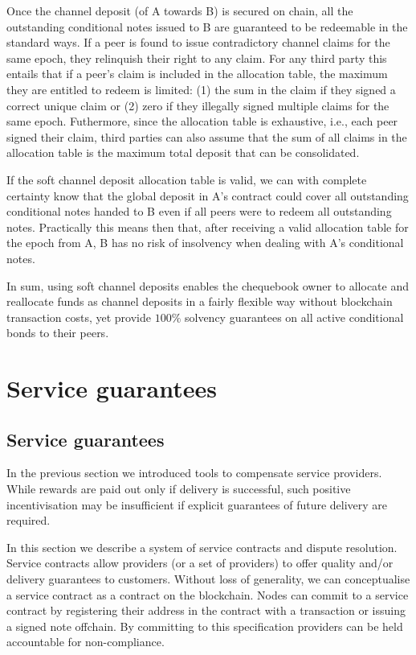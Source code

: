 \documentclass[a4paper,10pt]{article}
\begin{document}
Once the channel deposit (of A towards B) is secured on chain, all the outstanding conditional notes
issued to B are guaranteed to be redeemable in the standard ways.
If a peer is found to issue contradictory channel claims for the same epoch, they relinquish
their right to any claim. For any third party this entails that if a peer's claim is
included in the allocation table, the maximum they are entitled to redeem is limited:
(1) the sum in the claim if they signed a correct unique claim or
(2) zero if they illegally signed multiple claims for the same epoch.
Futhermore, since the allocation table is exhaustive, i.e., each
peer signed their claim, third parties can also assume that the sum of all claims in the
allocation table is the maximum total deposit that can be consolidated.

If the soft channel deposit allocation table is valid,
we can with complete certainty know that the global deposit in A's contract
 could cover all outstanding conditional notes handed to B even if all peers were to redeem all outstanding notes.
Practically this means then that, after receiving a valid allocation table for the epoch from A,
B has no risk of insolvency when dealing with A's conditional notes.

In sum, using soft channel deposits enables the chequebook owner to allocate and reallocate funds
as channel deposits in a fairly flexible way without blockchain transaction costs,
yet provide $100\%$ solvency guarantees on all active conditional bonds to their peers.


\section{Service guarantees}

\subsection{Service guarantees}
\label{sec:courtroom}

In the previous section we introduced tools to compensate service providers.
While rewards are paid out only if delivery is successful,
such positive incentivisation may be insufficient if
explicit guarantees of future delivery are required.

In this section we describe a system of service contracts and dispute resolution.
Service contracts allow providers (or a set of providers)
to offer quality and/or delivery guarantees to customers.
Without loss of generality, we can conceptualise a service contract as a contract
on the blockchain.
Nodes can commit to a service contract by registering their address in the contract
with a transaction or issuing a signed note offchain.
By committing to this specification providers can be held accountable for non-compliance.
\end{document}
